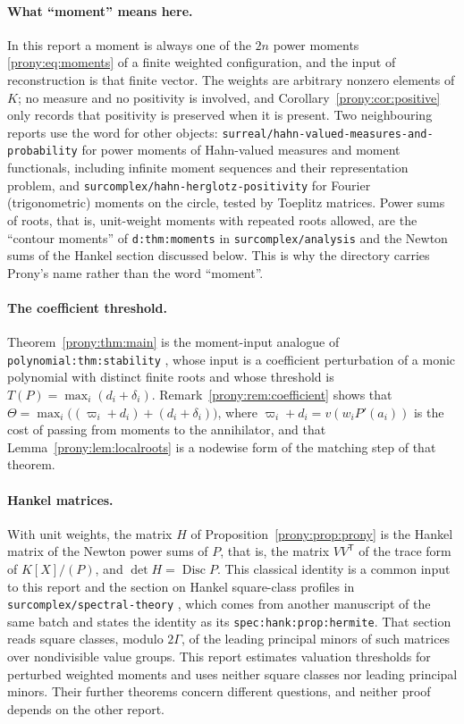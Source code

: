 \documentclass[11pt,letterpaper]{article}
\theoremstyle{definition}
\theoremstyle{remark}
\newcommand{\lbl}[1]{\nolinkurl{#1}}%
\DeclareMathOperator{\Disc}{Disc}
\begin{document}
\paragraph{What ``moment'' means here.}
In this report a moment is always one of the $2n$ power moments
\eqref{prony:eq:moments} of a finite weighted configuration, and the input
of reconstruction is that finite vector. The weights are arbitrary nonzero
elements of $K$; no measure and no positivity is involved, and
Corollary~\ref{prony:cor:positive} only records that positivity is preserved
when it is present. Two neighbouring reports use the word for other objects:
\lbl{surreal/hahn-valued-measures-and-probability} \cite{RepoMeas} for power
moments of Hahn-valued measures and moment functionals, including infinite
moment sequences and their representation problem, and
\lbl{surcomplex/hahn-herglotz-positivity} \cite{RepoHerg} for Fourier
(trigonometric) moments on the circle, tested by Toeplitz matrices. Power sums
of roots, that is, unit-weight moments with repeated roots allowed, are the
``contour moments'' of \lbl{d:thm:moments} in \lbl{surcomplex/analysis}
\cite{RepoAna} and the Newton sums of the Hankel section discussed below.
This is why the directory carries Prony's name rather than the word
``moment''.

\paragraph{The coefficient threshold.}
Theorem~\ref{prony:thm:main} is the moment-input analogue of
\lbl{polynomial:thm:stability} \cite{RepoPoly}, whose input is a
coefficient perturbation of a monic polynomial with distinct finite roots and
whose threshold is $T(P)=\max_i(d_i+\delta_i)$.
Remark~\ref{prony:rem:coefficient} shows that
$\Theta=\max_i\bigl((\varpi_i+d_i)+(d_i+\delta_i)\bigr)$, where
$\varpi_i+d_i=v(w_iP'(a_i))$ is the cost of passing from moments to the
annihilator, and that Lemma~\ref{prony:lem:localroots} is a nodewise form of
the matching step of that theorem.

\paragraph{Hankel matrices.}
With unit weights, the matrix $H$ of Proposition~\ref{prony:prop:prony} is
the Hankel matrix of the Newton power sums of $P$, that is, the matrix
$VV^{\mathsf T}$ of the trace form of $K[X]/(P)$, and $\det H=\Disc P$. This
classical identity is a common input to this report and the section on
Hankel square-class profiles in \lbl{surcomplex/spectral-theory}
\cite{RepoSpec}, which comes from another manuscript of the same batch and
states the identity as its \lbl{spec:hank:prop:hermite}. That
section reads square classes, modulo $2\Gamma$, of the leading principal
minors of such matrices over nondivisible value groups. This report
estimates valuation thresholds for perturbed weighted moments and uses
neither square classes nor leading principal minors. Their further theorems
concern different questions, and neither proof depends on the other report.
\end{document}
